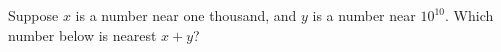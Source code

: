 \documentclass{ximera}
\begin{document}
\begin{problem}
  
  Suppose $x$ is a number near one thousand, and $y$ is a number near $10^{10}$.  Which number below is nearest $x + y$?
  \begin{multipleChoice}
  \end{multipleChoice}
\end{problem}
\end{document}
